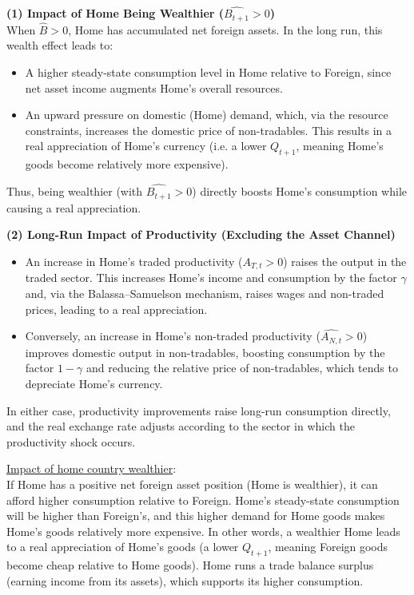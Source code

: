 \documentclass[a4paper,12pt]{article} %
\theoremstyle{nonitalic}
\begin{document}
\textbf{(1) Impact of Home Being Wealthier (\( \widehat{B_{t+1}} > 0 \))}\\
When \( \widehat{B} > 0 \), Home has accumulated net foreign assets. In the long run, this wealth effect leads to:
\begin{itemize}
    \item A higher steady-state consumption level in Home relative to Foreign, since net asset income augments Home's overall resources.
    \item An upward pressure on domestic (Home) demand, which, via the resource constraints, increases the domestic price of non-tradables. This results in a real appreciation of Home's currency (i.e. a lower \( Q_{t+1} \), 
    meaning Home's goods become relatively more expensive).
\end{itemize}
Thus, being wealthier (with \( \widehat{B_{t+1}} > 0 \)) directly boosts Home's consumption while causing a real appreciation.

\textbf{(2) Long-Run Impact of Productivity (Excluding the Asset Channel)}
\begin{itemize}
    \item An increase in Home's traded productivity (\( \widehat{A_{T,t}} > 0 \)) raises the output in the traded sector. This increases Home's income and consumption by the factor \( \gamma \) and, via the Balassa--Samuelson mechanism, raises wages and non-traded prices, leading to a real appreciation.
    \item Conversely, an increase in Home's non-traded productivity (\( \widehat{A_{N,t}} > 0 \)) improves domestic output in non-tradables, boosting consumption by the factor \( 1-\gamma \) and reducing the relative price of non-tradables, which tends to depreciate Home's currency.
\end{itemize}
In either case, productivity improvements raise long-run consumption directly, and the real exchange rate adjusts according to the sector in which the productivity shock occurs.

\underline{Impact of home country wealthier}: \\
If Home has a positive net foreign asset position (Home is wealthier), 
it can afford higher consumption relative to Foreign. 
Home's steady-state consumption will be higher than Foreign's, 
and this higher demand for Home goods makes Home's goods relatively more expensive. 
In other words, a wealthier Home leads to a real appreciation of Home's goods (a lower $Q_{t+1}$, 
meaning Foreign goods become cheap relative to Home goods). 
Home runs a trade balance surplus (earning income from its assets), 
which supports its higher consumption.
\end{document}
